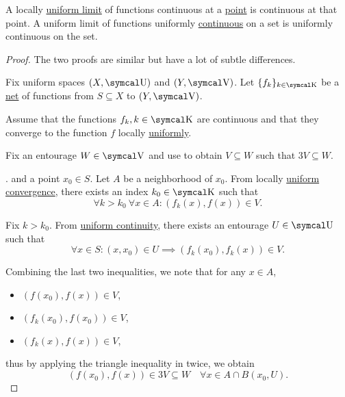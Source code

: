 \begin{proposition}\label{thm:uniform_limit_of_continuous_functions}
  \mbox{}
  \begin{PropEnum}
     A locally \hyperref[def:function_net_convergence]{uniform limit} of functions continuous at a \hyperref[thm:uniform_space_local_continuity]{point} is continuous at that point.
     A uniform limit of functions uniformly \hyperref[def:uniform_continuity]{continuous} on a set is uniformly continuous on the set.
  \end{PropEnum}
\end{proposition}
\begin{proof}
  The two proofs are similar but have a lot of subtle differences.

  Fix uniform spaces \( (X, \CU) \) and \( (Y, \CV) \). Let \( \{ f_k \}_{k \in \CK} \) be a \hyperref[def:topological_net]{net} of functions from \( S \subseteq X \) to \( (Y, \CV) \).

   Assume that the functions \( f_k, k \in \CK \) are continuous and that they converge to the function \( f \) locally \hyperref[def:function_net_convergence/locally_uniform]{uniformly}.

  Fix an entourage \( W \in \CV \) and use  to obtain \( V \subseteq W \) such that \( 3V \subseteq W \).

  . and a point \( x_0 \in S \). Let \( A \) be a neighborhood of \( x_0 \). From locally \hyperref[def:function_net_convergence]{uniform convergence}, there exists an index \( k_0 \in \CK \) such that
  \begin{equation*}
    \forall k > k_0 \ \forall x \in A : (f_k(x), f(x)) \in V.
  \end{equation*}

  Fix \( k > k_0 \). From \hyperref[def:function_net_convergence/locally_uniform]{uniform continuity}, there exists an entourage \( U \in \CU \) such that
  \begin{equation*}
    \forall x \in S : (x, x_0) \in U \implies (f_k(x_0), f_k(x)) \in V.
  \end{equation*}

  Combining the last two inequalities, we note that for any \( x \in A \),
  \begin{itemize}
    \item \( (f(x_0), f(x)) \in V \),
    \item \( (f_k(x_0), f(x_0)) \in V \),
    \item \( (f_k(x), f(x)) \in V \),
  \end{itemize}
  thus by applying the triangle inequality in  twice, we obtain
  \begin{equation*}
    (f(x_0), f(x)) \in 3V \subseteq W \quad\forall x \in A \cap B(x_0, U).
  \end{equation*}


\end{proof}
